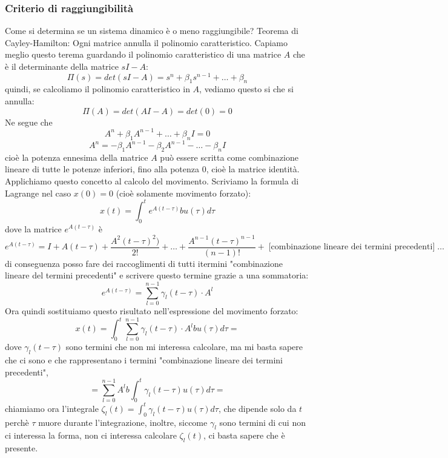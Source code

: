 \subsubsection{Criterio di raggiungibilità}
Come si determina se un sistema dinamico è o meno raggiungibile?\newline
\newline
Teorema di Cayley-Hamilton: Ogni matrice annulla il polinomio caratteristico.\newline
Capiamo meglio questo terema guardando il polinomio caratteristico di una matrice $A$ che è il determinante della matrice $sI-A$:
\[
    \Pi(s) = det(sI-A) = s^n + \beta_1 s^{n-1} + \dots + \beta_n
\]
quindi, se calcoliamo il polinomio caratteristico in $A$, vediamo questo si che si annulla:
\[
    \Pi(A) = det(AI-A) = det(0) = 0
\]
Ne segue che
\[
    A^n + \beta_1 A^{n-1} + \dots + \beta_n I = 0
\]
\[
    A^n = -\beta_1 A^{n-1} - \beta_2 A^{n-1} - \dots - \beta_n I
\]
cioè la potenza ennesima della matrice $A$ può essere scritta come combinazione lineare di tutte le potenze inferiori, fino alla potenza $0$, cioè la matrice identità.\newline
\newline
Applichiamo questo concetto al calcolo del movimento.\newline
Scriviamo la formula di Lagrange nel caso $x(0) = 0$ (cioè solamente movimento forzato):
\[
    x(t) = \int_{0}^{t}e^{A(t-\tau)} b u(\tau) d \tau
\]
dove la matrice $e^{A(t - \tau)}$ è
\[
    e^{A(t - \tau)} = I +A(t-\tau) + \frac{A^2(t-\tau)^2)}{2!} + \dots + \frac{A^{n-1} (t - \tau)^{n-1}}{(n-1)!} +\; \text{[combinazione lineare dei termini precedenti]}\;\dots 
\]
di conseguenza posso fare dei raccoglimenti di tutti itermini "combinazione lineare del termini precedenti" e scrivere questo termine grazie a una sommatoria:
\[
    e^{A(t - \tau)} = \sum_{l=0}^{n-1} \gamma_l(t-\tau) \cdot  A^l
\]
Ora quindi sostituiamo questo risultato nell'espressione del movimento forzato:
\[
    x(t) = \int_{0}^{t} \sum_{l=0}^{n-1} \gamma_l(t-\tau) \cdot  A^l b u(\tau)d \tau=
\]
dove $\gamma_l(t-\tau)$ sono termini che non mi interessa calcolare, ma mi basta sapere che ci sono e che rappresentano i termini "combinazione lineare dei termini precedenti",
\[
    = \sum_{l=0}^{n-1} A^l b \int_{0}^{t}\gamma_l (t-\tau) u(\tau)d \tau=
\]
chiamiamo ora l'integrale $\zeta_l (t) = \int_{0}^{t}\gamma_l (t-\tau) u(\tau)d \tau$, che dipende solo da $t$ perchè $\tau$ muore durante l'integrazione, inoltre, siccome $\gamma_l$ sono termini di cui non ci interessa la forma, non ci interessa calcolare $\zeta_l (t)$, ci basta sapere che è presente.\newline
